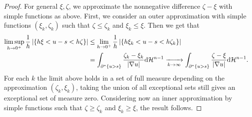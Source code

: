 \documentclass[11pt]{amsart}
\theoremstyle{plain}
\theoremstyle{definition}
\def\dd{{\rm d}}
\begin{document}
\begin{proof}
    For general $\xi, \zeta$, we approximate the nonnegative difference $\zeta - \xi$ with simple functions as above. First, we consider an outer approximation with simple functions $(\xi_k, \zeta_k)$ such that $\zeta \le \zeta_k$ and $\xi_k \le \xi$. Then we get that 
    \begin{align*}
        \limsup_{h \to 0^+} 
        \frac{1}{h}
        \left|
        \left\{
            h\xi < u - s < h \zeta
        \right\}
        \right|
        &\le 
        \lim_{h \to 0^+} 
        \frac{1}{h}
        \left|
        \left\{
            h\xi_k < u - s < h \zeta_k
        \right\}
        \right|\\
        &=
        \int_{\partial^*\{u > s\}} 
        \frac{\zeta_k - \xi_k}{|\nabla u|} 
        \dd\mathcal{H}^{n-1}
        \xrightarrow[k \to \infty]{} 
        \int_{\partial^*\{u > s\}} 
        \frac{\zeta - \xi}{|\nabla u|} 
        \dd\mathcal{H}^{n-1}. 
    \end{align*}
    For each $k$ the limit above holds in a set of full measure depending on the approximation $(\zeta_k, \xi_k)$, taking the union of all exceptional sets still gives an exceptional set of measure zero. Considering now an inner approximation by simple functions such that $\zeta \ge \zeta_k$ and $\xi_k \ge \xi$, the result follows.
\end{proof}
\end{document}

